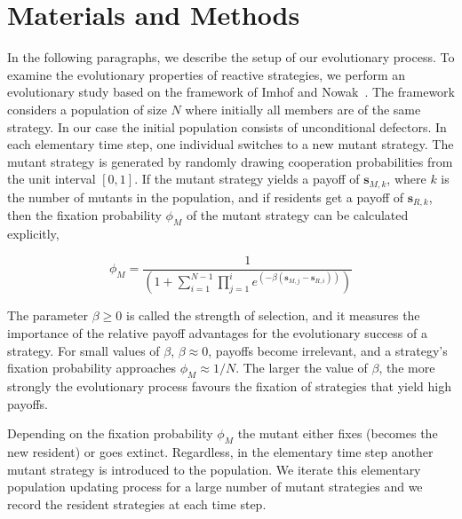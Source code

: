 \documentclass{article}
\theoremstyle{definition}
\begin{document}
\section{Materials and Methods}

In the following paragraphs, we describe the setup of our evolutionary process.
To examine the evolutionary properties of
reactive strategies, we perform an evolutionary study based on the framework of
Imhof and Nowak~\cite{imhof:royal:2010}. The framework considers a population
of size \(N\) where initially all members are of the same strategy. In our case
the initial population consists of unconditional defectors. In each elementary
time step, one individual switches to a new mutant strategy. The mutant strategy
is generated by randomly drawing cooperation probabilities from the unit
interval \([0,1]\). If the mutant strategy yields a payoff of \(\mathbf{s}_{M, k}\),
where \(k\) is the number of mutants in the population, and if residents get a
payoff of \(\mathbf{s}_{R, k}\), then the fixation probability \(\phi_{M}\) of the
mutant strategy can be calculated explicitly,

\begin{equation}\label{eq:fixation_probability}
  \phi_{M} = \frac{1}{\left(1 + \displaystyle \sum_{i=1}^{N - 1} \prod_{j=1}^{i} e^{(- \beta (\mathbf{s}_{M, j} - \mathbf{s}_{R, i}))} \right)}
\end{equation}

The parameter \(\beta \geq 0\) is called the strength of selection, and it
measures the importance of the relative payoff advantages for the
evolutionary success of a strategy. For small values of \(\beta\), \(\beta
\approx 0\), payoffs become irrelevant, and a strategy's fixation probability
approaches \(\phi_{M} \approx 1 / N\). The larger the value of \(\beta\), the
more strongly the evolutionary process favours the fixation of strategies that
yield high payoffs.

Depending on the fixation probability \(\phi_{M}\) the mutant either fixes
(becomes the new resident) or goes extinct. Regardless, in the elementary time
step another mutant strategy is introduced to the  population. We iterate this
elementary population updating process for a large number of mutant strategies
and we record the resident strategies at each time step.

~\\

\end{document}
